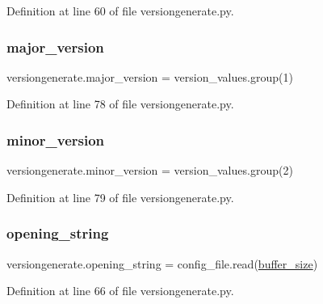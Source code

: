 Definition at line 60 of file versiongenerate.\+py.

\mbox{\label{namespaceversiongenerate_a4b536109523f1bc805806f8d76ca34ac}} 
\subsubsection{\texorpdfstring{major\+\_\+version}{major\_version}}
{\footnotesize\ttfamily versiongenerate.\+major\+\_\+version = version\+\_\+values.\+group(1)}



Definition at line 78 of file versiongenerate.\+py.

\mbox{\label{namespaceversiongenerate_af8027cbccfcda6a243f0544cc3c08b28}} 
\subsubsection{\texorpdfstring{minor\+\_\+version}{minor\_version}}
{\footnotesize\ttfamily versiongenerate.\+minor\+\_\+version = version\+\_\+values.\+group(2)}



Definition at line 79 of file versiongenerate.\+py.

\mbox{\label{namespaceversiongenerate_a88cc36d80d757546e04817490ebb0640}} 
\subsubsection{\texorpdfstring{opening\+\_\+string}{opening\_string}}
{\footnotesize\ttfamily versiongenerate.\+opening\+\_\+string = config\+\_\+file.\+read(\hyperlink{namespaceversiongenerate_a5656c48d43f7e869041b6a30c124702e}{buffer\+\_\+size})}



Definition at line 66 of file versiongenerate.\+py.

